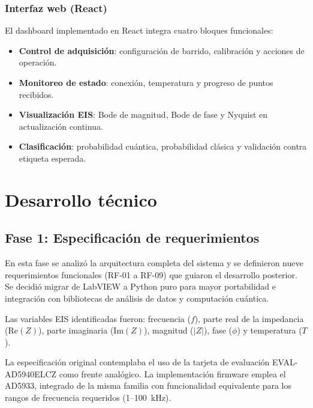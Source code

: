 \documentclass[11pt,a4paper,spanish]{book}
\begin{document}
\subsection{Interfaz web (React)}

El dashboard implementado en React integra cuatro bloques funcionales:
\begin{itemize}
	\item \textbf{Control de adquisici\'{o}n}: configuraci\'{o}n de barrido, calibraci\'{o}n y acciones de operaci\'{o}n.
	\item \textbf{Monitoreo de estado}: conexi\'{o}n, temperatura y progreso de puntos recibidos.
	\item \textbf{Visualizaci\'{o}n EIS}: Bode de magnitud, Bode de fase y Nyquist en actualizaci\'{o}n continua.
	\item \textbf{Clasificaci\'{o}n}: probabilidad cu\'{a}ntica, probabilidad cl\'{a}sica y validaci\'{o}n contra etiqueta esperada.
\end{itemize}

\chapter{Desarrollo t\'{e}cnico}

\section{Fase 1: Especificaci\'{o}n de requerimientos}

En esta fase se analiz\'{o} la arquitectura completa del sistema y se definieron nueve requerimientos funcionales (RF-01 a RF-09) que guiaron el desarrollo posterior. Se decidi\'{o} migrar de LabVIEW a Python puro para mayor portabilidad e integraci\'{o}n con bibliotecas de an\'{a}lisis de datos y computaci\'{o}n cu\'{a}ntica.

Las variables EIS identificadas fueron: frecuencia ($f$), parte real de la impedancia ($\mathrm{Re}(Z)$), parte imaginaria ($\mathrm{Im}(Z)$), magnitud ($|Z|$), fase ($\phi$) y temperatura ($T$).

La especificaci\'{o}n original contemplaba el uso de la tarjeta de evaluaci\'{o}n EVAL-AD5940ELCZ como frente anal\'{o}gico. La implementaci\'{o}n firmware emplea el AD5933, integrado de la misma familia con funcionalidad equivalente para los rangos de frecuencia requeridos (1--100~kHz).
\end{document}
